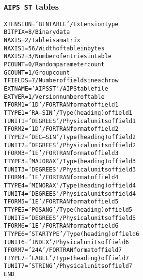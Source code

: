 \documentclass[twoside]{article}
\begin{document}
\subsubsection{{\tt AIPS ST} tables}
\label{Appe:STtable}
\begin{alltt}
XTENSION= 'BINTABLE'           / Extension type
BITPIX  =                    8 / Binary data
NAXIS   =                    2 / Table is a matrix
NAXIS1  =                   56 / Width of table in bytes
NAXIS2  =                    3 / Number of entries in table
PCOUNT  =                    0 / Random parameter count
GCOUNT  =                    1 / Group count
TFIELDS =                    7 / Number of fields in each row
EXTNAME = 'AIPS ST '           / AIPS table file
EXTVER  =                    1 / Version number of table
TFORM1  = '1D      '           / FORTRAN format of field  1
TTYPE1  = 'RA---SIN        '   / Type (heading) of field  1
TUNIT1  = 'DEGREES '           / Physical units of field  1
TFORM2  = '1D      '           / FORTRAN format of field  2
TTYPE2  = 'DEC--SIN        '   / Type (heading) of field  2
TUNIT2  = 'DEGREES '           / Physical units of field  2
TFORM3  = '1E      '           / FORTRAN format of field  3
TTYPE3  = 'MAJOR AX        '   / Type (heading) of field  3
TUNIT3  = 'DEGREES '           / Physical units of field  3
TFORM4  = '1E      '           / FORTRAN format of field  4
TTYPE4  = 'MINOR AX        '   / Type (heading) of field  4
TUNIT4  = 'DEGREES '           / Physical units of field  4
TFORM5  = '1E      '           / FORTRAN format of field  5
TTYPE5  = 'POSANG          '   / Type (heading) of field  5
TUNIT5  = 'DEGREES '           / Physical units of field  5
TFORM6  = '1E      '           / FORTRAN format of field  6
TTYPE6  = 'STARTYPE        '   / Type (heading) of field  6
TUNIT6  = 'INDEX   '           / Physical units of field  6
TFORM7  = '24A     '           / FORTRAN format of field  7
TTYPE7  = 'LABEL           '   / Type (heading) of field  7
TUNIT7  = 'STRING  '           / Physical units of field  7
END
\end{alltt}
\end{document}
